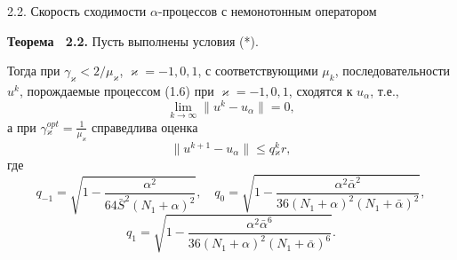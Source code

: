 \documentclass[10pt,pdf, mathserif, hyperref={unicode}]{beamer}
\begin{document}
\begin{frame}{\small 2.2. Скорость сходимости $\alpha$-процессов с немонотонным оператором}
	\begin{block}{\bf Теорема ~2.2.}
		Пусть выполнены условия (*). 
		
		Тогда при $\gamma_\varkappa<2/\mu _\varkappa$, $\varkappa=-1,0,1$, с соответствующими $\mu _k$, последовательности ${u^k}$, порождаемые процессом (1.6) при $\varkappa=-1,0,1$, сходятся к $u_\alpha$, т.е., $$\lim_{k\to\infty}\|u^k-u_\alpha\|=0,$$ а при $
		\gamma{_\varkappa^{opt}}=\frac{1}{\mu_\varkappa}$
		справедлива оценка $$\|u^{k+1}-u_\alpha\|\leqslant q{_\varkappa^k}r,$$ где
		$$q_{-1}=\sqrt{1-\frac{\alpha^2}{64\bar S^2(N_1+\alpha)^2}}, \quad q_0=\sqrt{1-\frac{\alpha^2\bar\alpha^2}{36(N_1+\alpha)^2(N_1+\bar\alpha)^2}},$$
		$$q_1=\sqrt{1-\frac{\alpha^2\bar\alpha^6}{36(N_1+\alpha)^2(N_1+\bar\alpha)^6}}.$$
	\end{block}
\end{frame}

%		
%		
\end{document}
